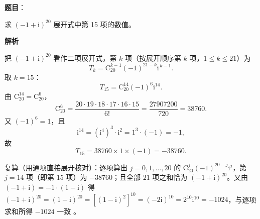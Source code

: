 \begin{answer}

\textbf{题目}：

求 $(-1+\mathrm i)^{20}$ 展开式中第 15 项的数值。

\textbf{解析}

把 $(-1+\mathrm i)^{20}$ 看作二项展开式，第 $k$ 项（按展开顺序第 $k$ 项，$1\le k\le21$）为
\nopagebreak[4]
\[
T_k=\mathrm C_{20}^{k-1}(-1)^{21-k}\mathrm i^{\,k-1}.
\]
取 $k=15$：
\nopagebreak[4]
\[
T_{15}=\mathrm C_{20}^{14}(-1)^{6}\mathrm i^{14}.
\]
由 $\mathrm C_{20}^{14}=\mathrm C_{20}^{6}$，
\nopagebreak[4]
\[
\mathrm C_{20}^{6}=\frac{20\cdot19\cdot18\cdot17\cdot16\cdot15}{6!}=\frac{27907200}{720}=38760.
\]
又 $(-1)^6=1$，且
\nopagebreak[4]
\[
\mathrm i^{14}=(\mathrm i^4)^3\cdot\mathrm i^2=1^3\cdot(-1)=-1,
\]
故
\nopagebreak[4]
\[
T_{15}=38760\times1\times(-1)=-38760.
\]

复算（用通项直接展开核对）：逐项算出 $j=0,1,\dots,20$ 的 $\mathrm C_{20}^{j}(-1)^{20-j}\mathrm i^{j}$，第 $j=14$ 项（即第 $15$ 项）为 $-38760$；且全部 $21$ 项之和恰为 $(-1+\mathrm i)^{20}$。又由 $(-1+\mathrm i)=-1\cdot(1-\mathrm i)$ 得 $(-1+\mathrm i)^{20}=(1-\mathrm i)^{20}=\left[(1-\mathrm i)^2\right]^{10}=(-2\mathrm i)^{10}=2^{10}\mathrm i^{10}=-1024$，与逐项求和所得 $-1024$ 一致 。


\end{answer}
